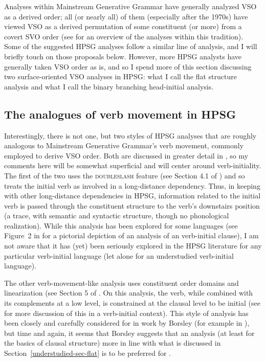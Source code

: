 \documentclass[output=paper
	        ,collection
	        ,collectionchapter
 	        ,biblatex
                ,babelshorthands
                ,newtxmath
                ,draftmode
                ,colorlinks, citecolor=brown
]{langscibook}
\begin{document}
Analyses within Mainstream Generative Grammar have generally analyzed VSO as a derived order; all (or nearly all) of them (especially after the 1970s) have viewed VSO as a derived permutation of some constituent (or more) from a covert SVO order (see \citealt{clemenspolinsky17} for an overview of the analyses within this tradition). Some of the suggested HPSG analyses follow a similar line of analysis, and I will briefly touch on those proposals below. However, more HPSG analysts have generally taken VSO order as is, and so I spend more of this section discussing two surface-oriented VSO analyses in HPSG: what I call the flat structure analysis and what I call the binary branching head-initial analysis.  

\subsection{The analogues of verb movement in HPSG}

Interestingly, there is not one, but two styles of HPSG analyses that are roughly analogous to Mainstream Generative Grammar's verb movement, commonly employed to derive VSO order. Both are discussed in greater detail in , so my comments here will be somewhat superficial and will center around verb-initiality. The first of the two uses the \textsc{doubleslash} feature (see Section 4.1 of ) and so treats the initial verb as involved in a long-distance dependency. Thus, in keeping with other long-distance dependencies in HPSG, information related to the initial verb is passed through the constituent structure to the verb's downstairs position (a trace, with semantic and syntactic structure, though no phonological realization). While this analysis has been explored for some  languages (see Figure~2 in  for a pictorial depiction of an analysis of an  verb-initial clause), I am not aware that it has (yet) been seriously explored in the HPSG literature for any particular verb-initial language (let alone for an understudied verb-initial language).  

The other verb-movement-like analysis uses constituent order domains and linearization (see Section 5 of . On this analysis, the verb, while combined with its complements at a low level, is constrained at the clausal level to be initial (see \citealt{borsley06} for more discussion of this in a verb-initial context). This style of analysis has been closely and carefully considered for  in work by Borsley (for example in \citealt{Borsley89b,borsley95,Borsley2009a-u}), but time and again, it seems that Borsley suggests that an analysis (at least for the basics of clausal structure) more in line with what is discussed in Section~\ref{understudied-sec-flat} is to be preferred for .   
\end{document}
